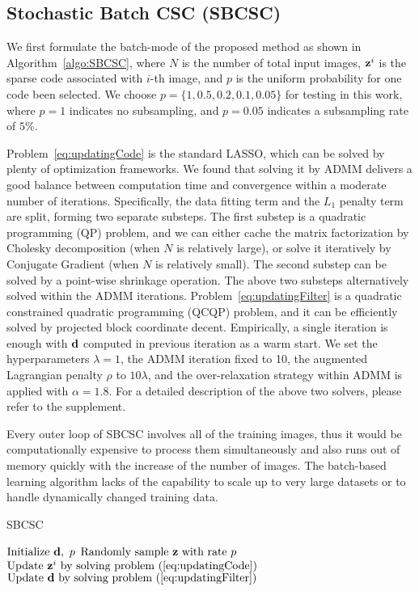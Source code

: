 \subsection{Stochastic Batch CSC (SBCSC)}
We first formulate the batch-mode of the proposed method as shown in Algorithm~\ref{algo:SBCSC}, where $N$ is the number of total input images, $\code^i$ is the sparse code associated with $i$-th image, and $p$ is the uniform probability for one code been selected. We choose $p=\{1, 0.5, 0.2, 0.1, 0.05\}$ for testing in this work, where $p=1$ indicates no subsampling, and $p=0.05$ indicates a subsampling rate of $5\%$. 

Problem~\ref{eq:updatingCode} is the standard LASSO, which can be solved by plenty of optimization frameworks. We found that solving it by ADMM delivers a good balance 
between computation time and convergence within a moderate number of iterations. Specifically, the data fitting term and the $L_1$ penalty term are split, forming two 
separate substeps. The first substep is a quadratic programming (QP) problem, and we can either cache the matrix factorization by Cholesky decomposition 
(when $N$ is relatively large), or solve it iteratively by Conjugate Gradient (when $N$ is relatively small). The second substep can be solved by a point-wise
 shrinkage operation. The above two substeps alternatively solved within the ADMM iterations. Problem~\ref{eq:updatingFilter} is a quadratic 
constrained quadratic programming (QCQP) problem, and it can be efficiently solved by projected block coordinate decent. Empirically, a single iteration is enough with $\filter$ computed in previous iteration as a warm start. We set the hyperparameters $\lambda=1$, the ADMM iteration fixed to 10, the augmented Lagrangian penalty $\rho$ to $10 \lambda$, and the over-relaxation strategy within ADMM is applied with $\alpha = 1.8$. For a detailed description of the above two solvers, please refer to the supplement.

Every outer loop of SBCSC involves all of the training images, thus it would be computationally expensive to process them simultaneously and also runs out of memory quickly with the increase of the number of images. The batch-based learning algorithm lacks of the capability to scale up to very large datasets or to handle dynamically changed training data.

\begin{algorithm}[H]
\caption{SBCSC} \label{algo:SBCSC}
\begin{algorithmic}[1]
\State $\text{Initialize } \filter, ~p$
    \State $ \text{Randomly sample }\code \text{ with rate } p $
        \State $ \text{Update } \code^i \text{ by solving problem~(\ref{eq:updatingCode}})$
    \EndFor
    \State $\text{Update } \filter \text{ by solving problem~(\ref{eq:updatingFilter}})$
\EndWhile
\end{algorithmic}
\end{algorithm}

